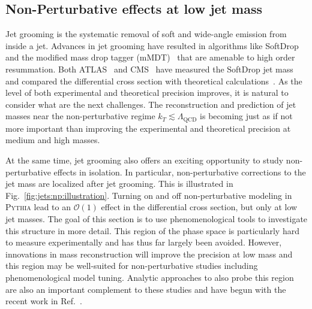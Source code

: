 \documentclass[11pt]{cernrep}
\begin{document}
\subsection{Non-Perturbative effects at low jet mass}
\label{sec:jets:np}

Jet grooming is the systematic removal of soft and wide-angle emission from inside a jet.  Advances in jet grooming have resulted in algorithms like SoftDrop and the modified mass drop tagger (mMDT)~\cite{Larkoski:2014wba,Dasgupta:2013ihk} that are amenable to high order resummation.   Both ATLAS~\cite{Aaboud:2017qwh,Aad:2019vyi} and CMS~\cite{Sirunyan:2018xdh} have measured the SoftDrop jet mass and compared the differential cross section with theoretical calculations~\cite{Frye:2016aiz,Frye:2016okc,Marzani:2017mva,Marzani:2017kqd,Kang:2018vgn,Kang:2018jwa,Baron:2018nfz,Kardos:2018kth}.  As the level of both experimental and theoretical precision improves, it is natural to consider what are the next challenges.  The reconstruction and prediction of jet masses near the non-perturbative regime $k_T\lesssim \Lambda_\text{QCD}$ is becoming just as if not more important than improving the experimental and theoretical precision at medium and high masses.

At the same time, jet grooming also offers an exciting opportunity to study non-perturbative effects in isolation.  In particular, non-perturbative corrections to the jet mass are localized after jet grooming.  This is illustrated in Fig.~\ref{fig:jets:np:illustration}.  Turning on and off non-perturbative modeling in \textsc{Pythia} lead to an $\mathcal{O}(1)$ effect in the differential cross section, but only at low jet masses.  The goal of this section is to use phenomenological tools to investigate this structure in more detail.  This region of the phase space is particularly hard to measure experimentally and has thus far largely been avoided.  However, innovations in mass reconstruction will improve the precision at low mass and this region may be well-suited for non-perturbative studies including phenomenological model tuning.  Analytic approaches to also probe this region are also an important complement to these studies and have begun with the recent work in Ref.~\cite{Hoang:2019ceu}.
\end{document}
